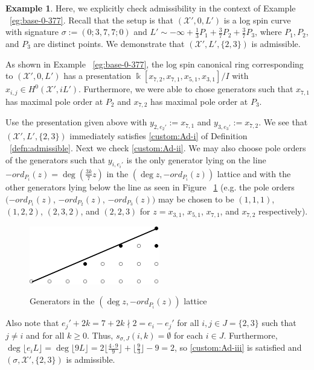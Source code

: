 \documentclass{amsart}
\theoremstyle{plain}
\theoremstyle{definition}
\newtheorem{example}[thm]{Example}
\theoremstyle{remark}
\numberwithin{equation}{section}
\newcommand\Bk{{\Bbbk}}
\newcommand\sx{\mathscr X}
\newcommand{\halfcan}{L}
\begin{document}
\begin{example}
\label{eg:base-0-377-adm}
Here, we explicitly check admissibility in the context of
Example ~\ref{eg:base-0-377}. Recall that the setup is that
$(\sx', 0, \halfcan')$ is a log spin curve with signature $\sigma := (0; 3, 7, 7; 0)$
and $\halfcan' \sim -\infty + \frac{1}{3}P_1 + \frac{3}{7}P_2 + \frac{3}{7}P_3$,
where $P_1, P_2$, and $P_3$ are distinct points. We demonstrate
that $(\sx', \halfcan', \{2, 3\})$ is admissible.

As shown in Example ~\ref{eg:base-0-377}, the log spin canonical
ring corresponding to $(\sx', 0, \halfcan')$ has a presentation
$\Bk[x_{7, 2}, x_{7, 1}, x_{5, 1}, x_{3, 1}] / I$ with
$x_{i, j} \in H^0(\sx', i \halfcan')$. Furthermore, we were
able to chose generators such that $x_{7, 1}$ has maximal pole
order at $P_2$ and $x_{7, 2}$ has maximal pole order at $P_3$.

Use the presentation given above with $y _{2, e_2'} :=
x_{7, 1}$ and $y_{3, e_3'} :=  x_{7, 2}$.
We see that $(\sx', \halfcan', \{2, 3\})$ immediately satisfies
\ref{custom:Ad-i} of Definition ~\ref{defn:admissible}. Next we
check \ref{custom:Ad-ii}.  We may also choose
pole orders of the generators such that $y_{i, e_i'}$ is the only
generator lying on the line $-ord_{P_i}(z) = \deg (\frac{3k}{7} z)$
in the $(\deg z, -ord_{P_i}(z))$  lattice and with the other
generators lying below the line as seen in Figure ~\ref{fig:377}
(e.g. the pole orders $(-ord_{P_1}(z)$, $-ord_{P_2}(z)$, $-ord_{P_3}
(z))$ may be chosen to be $(1, 1, 1)$, $(1, 2, 2)$, $(2, 3, 2)$,
and $(2, 2, 3)$ for $z = x_{3, 1}$, $x_{5, 1}$, $x_{7, 1}$, and
$x_{7, 2}$ respectively).

\begin{figure}[H]
\includegraphics{pics/spin-377-pic-pics.pdf} \\
\caption{Generators in the $(\deg z, -ord_{P_i}(z))$ lattice}
\label{fig:377}
\end{figure}

Also note that $e_j' + 2k = 7 + 2k \nmid 2 = e_i - e_j'$ for all
$i, j \in J = \{2, 3\}$ such that $j \neq i$ and for all $k \geq
0$. Thus, $s_{\sigma, J}(i, k) = \emptyset$ for each $i \in J$.
Furthermore, $\deg \lfloor e_i \halfcan \rfloor = \deg \lfloor 9
\halfcan \rfloor = 2 \lfloor \frac{4 \cdot 9}{9} \rfloor + \lfloor
\frac{9}{3} \rfloor - 9 = 2$, so \ref{custom:Ad-iii} is satisfied and
$(\sigma, \sx', \{2, 3\})$ is admissible.
\end{example}
\end{document}
